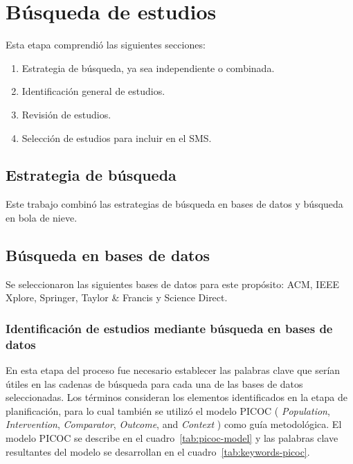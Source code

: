 \section{Búsqueda de estudios}


Esta etapa comprendió las siguientes secciones: 
\begin{enumerate}[noitemsep, topsep=0pt, partopsep=0pt]
  \item Estrategia de búsqueda, ya sea independiente o combinada.
  \item Identificación general de estudios.
  \item Revisión de estudios.
  \item Selección de estudios para incluir en el SMS.\@
\end{enumerate}

\subsection{Estrategia de búsqueda}

Este trabajo combinó las estrategias de búsqueda en bases de datos y búsqueda en bola de nieve. 

\subsection{Búsqueda en bases de datos}\label{subsec:busquedaBasesDatos}
Se seleccionaron las siguientes bases de datos para este propósito: ACM, IEEE Xplore, Springer, Taylor \& Francis y Science Direct.

\subsubsection{Identificación de estudios mediante búsqueda en bases de datos}\label{subsubsec:identificacionEstudios}
En esta etapa del proceso fue necesario establecer las palabras clave que serían útiles en las cadenas de búsqueda para cada una de las bases de datos seleccionadas. 
Los términos consideran los elementos identificados en la etapa de planificación, para lo cual también se utilizó el modelo PICOC ( \textit{Population}, \textit{Intervention}, \textit{Comparator}, \textit{Outcome}, and \textit{Context} ) como guía metodológica. El modelo PICOC se describe en el cuadro~\ref{tab:picoc-model} y las palabras clave resultantes del modelo se desarrollan en el cuadro~\ref{tab:keywords-picoc}.

